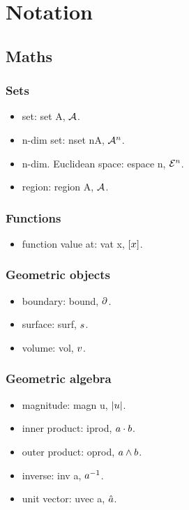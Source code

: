\section{Notation}

\subsection{Maths}

\subsubsection{Sets}
\begin{itemize}
\item set: set A, $\set A$.
\item n-dim set: nset nA, $\nset nA$.
\item n-dim. Euclidean space: espace n, $\espace n$.
\item region: region A, $\region A$.
\end{itemize}


\subsubsection{Functions}
\begin{itemize}
\item function value at: vat x, $\vat x$.
\end{itemize}


\subsubsection{Geometric objects}
\begin{itemize}
\item boundary: bound, $\bound$.
\item surface: surf, $\surf$.
\item volume: vol, $\vol$.
\end{itemize}


\subsubsection{Geometric algebra}
\begin{itemize}
\item magnitude: magn u, $\magn u$.
\item inner product: iprod, $a\iprod b$.
\item outer product: oprod, $a\oprod b$.
\item inverse: inv a, $\inv a$.
\item unit vector: uvec a, $\uvec a$.
\end{itemize}


